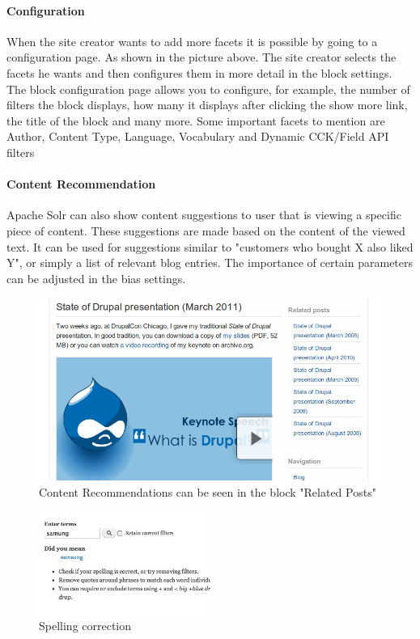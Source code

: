 \paragraph{Configuration} When the site creator wants to add more facets it is possible by going to a configuration page. As shown in the picture above. The site creator selects the facets he wants and then configures them in more detail in the block settings. The block configuration page allows you to configure, for example, the number of filters the block displays, how many it displays after clicking the show more link, the title of the block and many more. Some important facets to mention are Author, Content Type, Language, Vocabulary and Dynamic CCK/Field API filters

\paragraph{Content Recommendation}
Apache Solr can also show content suggestions to user that is viewing a specific piece of content. These suggestions are made based on the content of the viewed text. It can be used for suggestions similar to "customers who bought X also liked Y", or simply a list of relevant blog entries. The importance of certain parameters can be adjusted in the bias settings.
\begin{figure}[H]
     \includegraphics[width=\textwidth]{images/more_like_this.png}
     \caption{Content Recommendations can be seen in the block "Related Posts"}
\end{figure}

\begin{figure}
\begin{center}
     \includegraphics[width=0.5\textwidth]{images/spellchecker.jpg}
     \caption{Spelling correction}
\end{center}
\end{figure}
